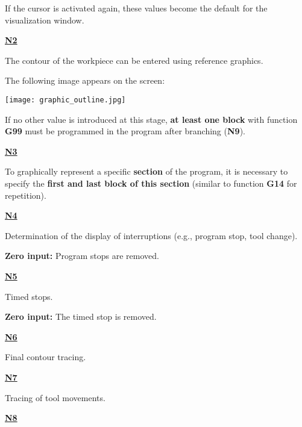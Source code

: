 If the cursor is activated again, these values become the default for the visualization window.

\underline{\textbf{N2}}

The contour of the workpiece can be entered using reference graphics.

\newpage
\procedure

\begin{itemize}
\end{itemize}

\vspace{.5cm}

\begin{itemize}
\end{itemize}

\vspace{.5cm}

The following image appears on the screen:

\begin{center}
    \texttt{[image: graphic\_outline.jpg]}
\end{center}

\notes

If no other value is introduced at this stage, \textbf{at least one block} with function \textbf{G99} must be programmed in the program after branching (\textbf{N9}).

\underline{\textbf{N3}}

To graphically represent a specific \textbf{section} of the program, it is necessary to specify the \textbf{first and last block of this section} (similar to function \textbf{G14} for repetition).

\underline{\textbf{N4}}

Determination of the display of interruptions (e.g., program stop, tool change).

\textbf{Zero input:} Program stops are removed.

\underline{\textbf{N5}}

Timed stops.

\textbf{Zero input:} The timed stop is removed.

\underline{\textbf{N6}}

Final contour tracing.

\underline{\textbf{N7}}

Tracing of tool movements.

\underline{\textbf{N8}}

